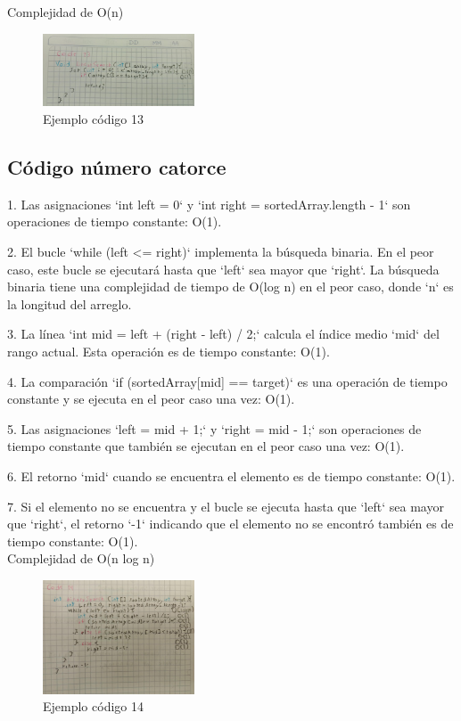 \documentclass[journal, spanish]{IEEEtran}
\begin{document}
Complejidad de O(n)


\begin{figure}[H]
  \centering
  \includegraphics[width=0.4\textwidth]{WhatsApp Image 2023-09-11 at 8.03.21 PM (1).jpeg}
  \caption{Ejemplo código 13}
  \label{fig:imagen1}
\end{figure}

\subsection{Código número catorce}
1. Las asignaciones `int left = 0` y `int right = sortedArray.length - 1` son operaciones de tiempo constante: O(1).

2. El bucle `while (left <= right)` implementa la búsqueda binaria. En el peor caso, este bucle se ejecutará hasta que `left` sea mayor que `right`. La búsqueda binaria tiene una complejidad de tiempo de O(log n) en el peor caso, donde `n` es la longitud del arreglo.

3. La línea `int mid = left + (right - left) / 2;` calcula el índice medio `mid` del rango actual. Esta operación es de tiempo constante: O(1).

4. La comparación `if (sortedArray[mid] == target)` es una operación de tiempo constante y se ejecuta en el peor caso una vez: O(1).

5. Las asignaciones `left = mid + 1;` y `right = mid - 1;` son operaciones de tiempo constante que también se ejecutan en el peor caso una vez: O(1).

6. El retorno `mid` cuando se encuentra el elemento es de tiempo constante: O(1).

7. Si el elemento no se encuentra y el bucle se ejecuta hasta que `left` sea mayor que `right`, el retorno `-1` indicando que el elemento no se encontró también es de tiempo constante: O(1).\\

Complejidad de O(n log n)

\begin{figure}[H]
  \centering
  \includegraphics[width=0.4\textwidth]{WhatsApp Image 2023-09-11 at 8.03.37 PM.jpeg}
  \caption{Ejemplo código 14}
  \label{fig:imagen1}
\end{figure}
\end{document}
